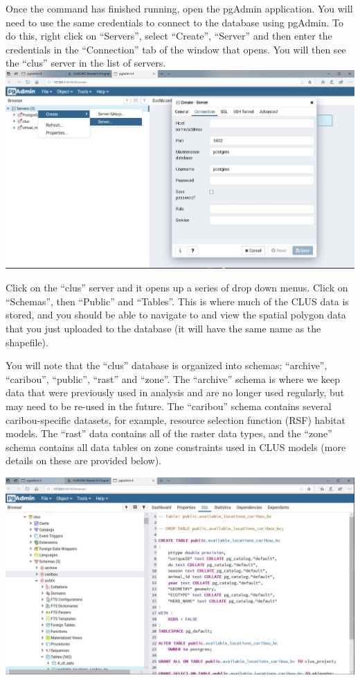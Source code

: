 \documentclass[
]{article}
\begin{document}
Once the command has finished running, open the pgAdmin application. You
will need to use the same credentials to connect to the database using
pgAdmin. To do this, right click on ``Servers'', select ``Create'',
``Server'' and then enter the credentials in the ``Connection'' tab of
the window that opens. You will then see the ``clus'' server in the list
of servers.\\
\includegraphics{images/pgadmin.jpg}

Click on the ``clus'' server and it opens up a series of drop down
menus. Click on ``Schemas'', then ``Public'' and ``Tables''. This is
where much of the CLUS data is stored, and you should be able to
navigate to and view the spatial polygon data that you just uploaded to
the database (it will have the same name as the shapefile).

You will note that the ``clus'' database is organized into schemas:
``archive'', ``caribou'', ``public'', ``rast'' and ``zone''. The
``archive'' schema is where we keep data that were previously used in
analysis and are no longer used regularly, but may need to be re-used in
the future. The ``caribou'' schema contains several caribou-specific
datasets, for example, resource selection function (RSF) habitat models.
The ``rast'' data contains all of the raster data types, and the
``zone'' schema contains all data tables on zone constraints used in
CLUS models (more details on these are provided below).

\includegraphics{images/pgadmin2.jpg}
\end{document}

